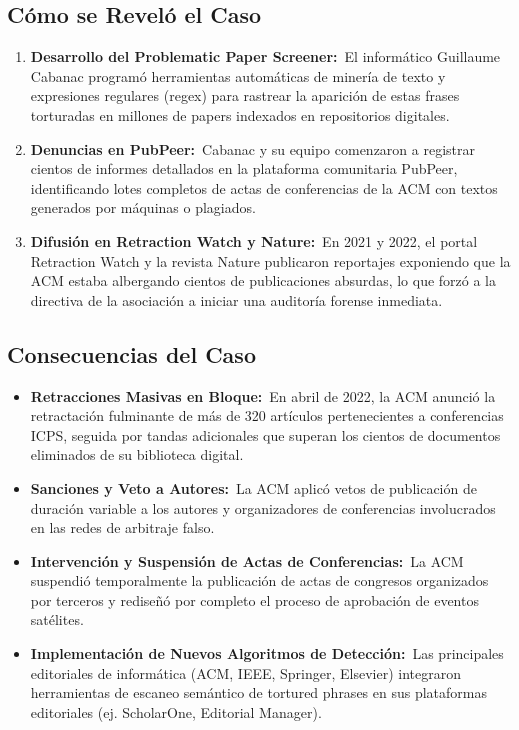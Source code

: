 \documentclass[12pt,a4paper]{article}
\newcommand{\itemlabel}[3]{\textbf{#1#2}~#3}
\begin{document}
\subsection{Cómo se Reveló el Caso}
\begin{enumerate}
\item \itemlabel{Desarrollo del Problematic Paper Screener}{:}{El informático Guillaume Cabanac programó herramientas automáticas de minería de texto y expresiones regulares (regex) para rastrear la aparición de estas frases torturadas en millones de papers indexados en repositorios digitales.}
\item \itemlabel{Denuncias en PubPeer}{:}{Cabanac y su equipo comenzaron a registrar cientos de informes detallados en la plataforma comunitaria PubPeer, identificando lotes completos de actas de conferencias de la ACM con textos generados por máquinas o plagiados.}
\item \itemlabel{Difusión en Retraction Watch y Nature}{:}{En 2021 y 2022, el portal Retraction Watch y la revista Nature publicaron reportajes exponiendo que la ACM estaba albergando cientos de publicaciones absurdas, lo que forzó a la directiva de la asociación a iniciar una auditoría forense inmediata.}
\end{enumerate}
\subsection{Consecuencias del Caso}
\begin{itemize}
\item \itemlabel{Retracciones Masivas en Bloque}{:}{En abril de 2022, la ACM anunció la retractación fulminante de más de 320 artículos pertenecientes a conferencias ICPS, seguida por tandas adicionales que superan los cientos de documentos eliminados de su biblioteca digital.}
\item \itemlabel{Sanciones y Veto a Autores}{:}{La ACM aplicó vetos de publicación de duración variable a los autores y organizadores de conferencias involucrados en las redes de arbitraje falso.}
\item \itemlabel{Intervención y Suspensión de Actas de Conferencias}{:}{La ACM suspendió temporalmente la publicación de actas de congresos organizados por terceros y rediseñó por completo el proceso de aprobación de eventos satélites.}
\item \itemlabel{Implementación de Nuevos Algoritmos de Detección}{:}{Las principales editoriales de informática (ACM, IEEE, Springer, Elsevier) integraron herramientas de escaneo semántico de tortured phrases en sus plataformas editoriales (ej. ScholarOne, Editorial Manager).}
\end{itemize}
\end{document}
